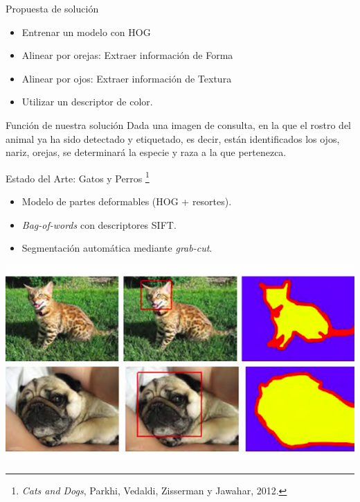 \documentclass{beamer}
\begin{document}
	\begin{frame}{Propuesta de solución}
\begin{itemize}
\item{
		Entrenar un modelo con HOG
}
\item{
		Alinear por orejas: Extraer información de Forma
}
\item{
		Alinear por ojos: Extraer información de Textura
}
\item{
		Utilizar un descriptor de color.
}
\end{itemize}
	\end{frame}
	\begin{frame}{Función de nuestra solución}
		Dada una imagen de consulta, en la que el rostro del animal ya ha sido
        detectado y etiquetado, es decir, están identificados los ojos, nariz,
        orejas, se determinará la especie y raza a la que pertenezca. 
	\end{frame}

    \begin{frame}{Estado del Arte: Gatos y Perros \footnote{\emph{Cats and
        Dogs}, Parkhi, Vedaldi, Zisserman y Jawahar, 2012.}}
        \begin{itemize}
            \item Modelo de partes deformables (HOG + resortes).
            \item \emph{Bag-of-words} con descriptores SIFT. 
            \item Segmentación automática mediante \emph{grab-cut}.
        \end{itemize}
        \begin{center}
            \includegraphics[scale=0.3]{imagen/catsanddogs_annotation}
        \end{center}
	\end{frame}
\end{document}
